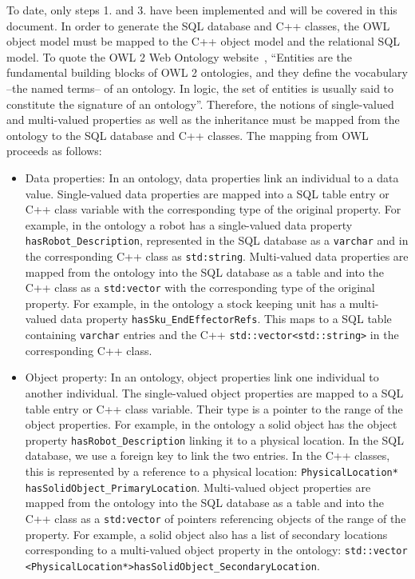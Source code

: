 To date, only steps 1. and 3. have been implemented and will be covered in this document.
In order to generate the SQL database and C++ classes, the OWL object model must be mapped to the C++ object model and the relational SQL model. 
To quote the OWL 2 Web Ontology website~\cite{OWLspec}, ``Entities are the fundamental building blocks of OWL 2 ontologies, 
and they define the vocabulary --the named terms-- of an ontology. In logic, the set of entities is usually said to constitute the 
signature of an ontology''. Therefore, the notions of single-valued and multi-valued properties as well as the inheritance must be 
mapped from the ontology to the SQL database and C++ classes. The mapping from OWL proceeds as follows:
\begin{itemize}
\item Data properties: In an ontology, data properties link an individual to a data value. Single-valued data properties are mapped into a SQL table entry or C++ class
variable with the corresponding type of the original property. For example, in the ontology a robot has a single-valued data 
property \texttt{hasRobot\_Description}, represented in the
SQL database as a \texttt{varchar} and in the corresponding C++ class as \texttt{std:string}. 
Multi-valued data properties are mapped from the ontology into the SQL database as a table and into the C++ class as a \texttt{std:vector} with the corresponding
type of the original property. For example,
in the ontology a stock keeping unit has a multi-valued
data property \texttt{hasSku\_EndEffectorRefs}. This maps to a SQL table containing \texttt{varchar} entries and the C++
\texttt{std::vector\textless std::string\textgreater} in the corresponding C++ class.

\item Object property: In an ontology, object properties link one individual to another individual. 
The single-valued object properties are mapped to a SQL table entry or C++ class
variable. Their type is a pointer to the range of the object properties. For example, in the ontology a solid object has the object property \texttt{hasRobot\_Description} 
linking it to a physical location. In the SQL database, we use a foreign key to link the two entries. In the C++ classes, this is represented by a reference to a physical location: \texttt{PhysicalLocation* hasSolidObject\_PrimaryLocation}.
Multi-valued object properties are mapped from the ontology into the SQL database as a table and into the C++ class as a \texttt{std:vector} of pointers referencing objects of the range of the property.  For example, a solid object also has a list of secondary locations corresponding to a multi-valued object property in the ontology: {\scriptsize\texttt{std::vector\\ \textless PhysicalLocation*\textgreater hasSolidObject\_SecondaryLocation}}.
\end{itemize}

